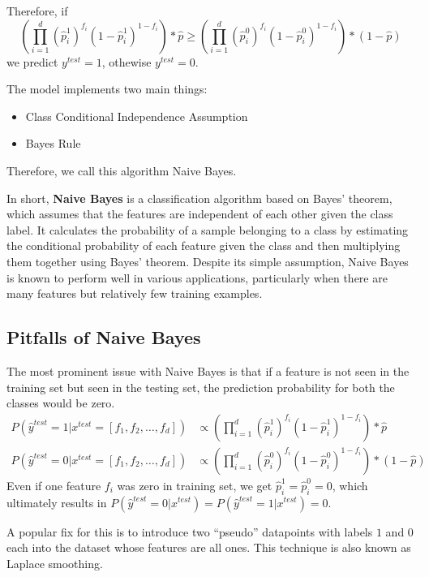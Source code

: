 \documentclass[
]{article}
\providecommand{\tightlist}{%
  \setlength{\itemsep}{0pt}\setlength{\parskip}{0pt}}
\begin{document}
\newpage
Therefore, if \[
\left(\prod_{i=1}^d(\hat{p}^1_i)^{f_i}(1-\hat{p}^1_i)^{1-f_i}\right)*\hat{p} \ge \left(\prod_{i=1}^d(\hat{p}^0_i)^{f_i}(1-\hat{p}^0_i)^{1-f_i}\right)*(1-\hat{p})
\] we predict \(y^{test}=1\), othewise \(y^{test}=0\).

The model implements two main things:

\begin{itemize}
\tightlist
\item
  Class Conditional Independence Assumption
\item
  Bayes Rule
\end{itemize}

Therefore, we call this algorithm Naive Bayes.

In short, \textbf{Naive Bayes} is a classification algorithm based on
Bayes' theorem, which assumes that the features are independent of each
other given the class label. It calculates the probability of a sample
belonging to a class by estimating the conditional probability of each
feature given the class and then multiplying them together using Bayes'
theorem. Despite its simple assumption, Naive Bayes is known to perform
well in various applications, particularly when there are many features
but relatively few training examples.

\hypertarget{pitfalls-of-naive-bayes}{%
\subsection{Pitfalls of Naive Bayes}\label{pitfalls-of-naive-bayes}}

The most prominent issue with Naive Bayes is that if a feature is not
seen in the training set but seen in the testing set, the prediction
probability for both the classes would be zero. \begin{align*}
P(\hat{y}^{test}=1|x^{test} = [f_1, f_2, \ldots, f_d])&\propto\left(\prod_{i=1}^d(\hat{p}^1_i)^{f_i}(1-\hat{p}^1_i)^{1-f_i}\right)*\hat{p}\\
P(\hat{y}^{test}=0|x^{test} = [f_1, f_2, \ldots, f_d])&\propto\left(\prod_{i=1}^d(\hat{p}^0_i)^{f_i}(1-\hat{p}^0_i)^{1-f_i}\right)*(1-\hat{p})
\end{align*} Even if one feature \(f_i\) was zero in training set, we
get \(\hat{p}^1_i=\hat{p}^0_i=0\), which ultimately results in
\(P(\hat{y}^{test}=0|x^{test})=P(\hat{y}^{test}=1|x^{test})=0\).

A popular fix for this is to introduce two ``pseudo'' datapoints with
labels \(1\) and \(0\) each into the dataset whose features are all
ones. This technique is also known as Laplace smoothing.
\end{document}
